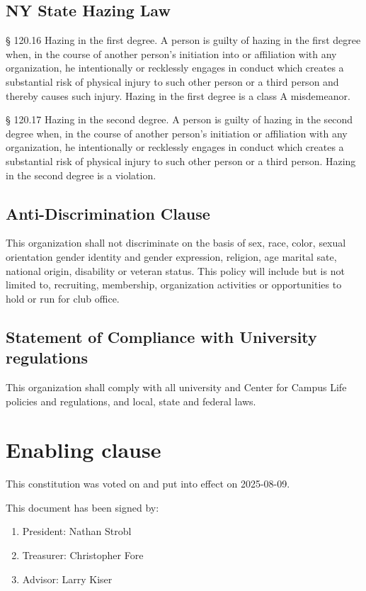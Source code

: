 \documentclass[a4paper]{article}
\begin{document}
\subsection{NY State Hazing Law}
\begin{subroutines}
    \item § 120.16 Hazing in the first degree. A person is guilty of hazing in the first degree when, in the course of another person's initiation into or affiliation with any organization, he intentionally or recklessly engages in conduct which creates a substantial risk of physical injury to such other person or a third person and thereby causes such injury. Hazing in the first degree is a class A misdemeanor.
    \item § 120.17 Hazing in the second degree. A person is guilty of hazing in the second degree when, in the course of another person's initiation or affiliation with any organization, he intentionally or recklessly engages in conduct which creates a substantial risk of physical injury to such other person or a third person. Hazing in the second degree is a violation.
\end{subroutines}
\subsection{Anti-Discrimination Clause}
\begin{subroutines}
    \item This organization shall not discriminate on the basis of sex, race, color, sexual orientation gender identity and gender expression, religion, age marital sate, national origin, disability or veteran status. This policy will include but is not limited to, recruiting, membership, organization activities or opportunities to hold or run for club office.
\end{subroutines}
\subsection{Statement of Compliance with University regulations}
\begin{subroutines}
    \item This organization shall comply with all university and Center for Campus Life policies and regulations, and local, state and federal laws.
\end{subroutines}

\section{Enabling clause}
\begin{subroutines}
    \item This constitution was voted on and put into effect on 2025-08-09.
    \item This document has been signed by:
    \begin{enumerate}
        \item President: Nathan Strobl
        \item Treasurer: Christopher Fore
        \item Advisor: Larry Kiser
        \end{enumerate}
\end{subroutines}
\end{document}

